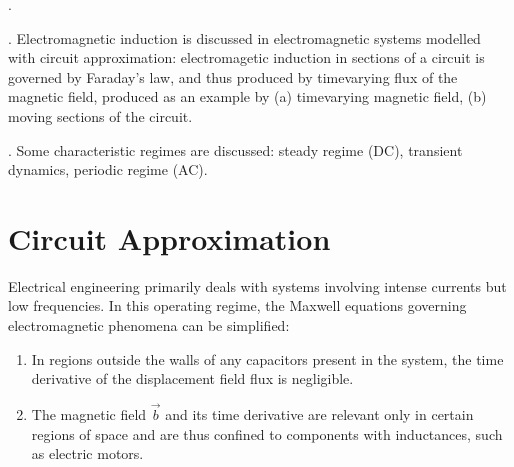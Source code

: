 \documentclass[letterpaper,10pt,english]{jupyterBook}
\begin{document}
\sphinxAtStartPar
{\hyperref[\detokenize{ch/circuits-electric-elementary-connections:physics-hs-electromagnetism-circuits-electric-components-configurations}]{}}.

\sphinxAtStartPar
{\hyperref[\detokenize{ch/circuits-electric-induction:classical-electromagnetism-circuits-electric-induction}]{}}. Electromagnetic induction is discussed in electromagnetic systems modelled with circuit approximation: electromagetic induction in sections of a circuit is governed by Faraday’s law, and thus produced by time\sphinxhyphen{}varying flux of the magnetic field, produced as an example by (a) time\sphinxhyphen{}varying magnetic field, (b) moving sections of the circuit.

\sphinxAtStartPar
{\hyperref[\detokenize{ch/circuits-electric-regimes:classical-electromagnetism-circuits-electric-regimes}]{}}. Some characteristic regimes are discussed: steady regime (DC), transient dynamics, periodic regime (AC).



\sphinxstepscope




\section{Circuit Approximation}
\label{\detokenize{ch/circuits-electric-components:circuit-approximation}}\label{\detokenize{ch/circuits-electric-components:classical-electromagnetism-circuits-electric-approx}}\label{\detokenize{ch/circuits-electric-components::doc}}
\sphinxAtStartPar
Electrical engineering primarily deals with systems involving intense currents but low frequencies. In this operating regime, the Maxwell equations governing electromagnetic phenomena can be simplified:
\begin{enumerate}
%
\item {} 
\sphinxAtStartPar
In regions outside the walls of any capacitors present in the system, the time derivative of the displacement field flux is negligible.

\item {} 
\sphinxAtStartPar
The magnetic field \(\vec{b}\) and its time derivative are relevant only in certain regions of space and are thus confined to components with inductances, such as electric motors.

\end{enumerate}
\end{document}

